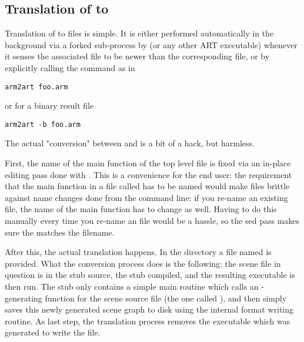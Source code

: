 \subsection{Translation of  to }

Translation of  to  files is simple. It is either
performed automatically in the background via a forked sub-process by  (or any other ART executable) whenever it senses the associated  file to be newer than the corresponding  file, or by explicitly calling the command
 as in
\begin{verbatim}
arm2art foo.arm
\end{verbatim}
or for a binary  result file
\begin{verbatim}
arm2art -b foo.arm
\end{verbatim}

The actual "conversion" between  and  is a bit of a hack, but harmless. 

First, the name of the main function of the top level  file is fixed via an in-place editing pass done with . This is a convenience for the end user: the requirement that the main function in a file called  has to be named  would make  files brittle against name changes done from the command line: if you re-name an existing  file, the name of the main function has to change as well. Having to do this manually every time you re-name an  file would be a hassle, so the sed pass makes sure the  matches the filename. 

After this, the actual translation happens. In the  directory a file named  is provided. What the conversion process does is the following: the scene file in question is  in the stub source, the stub compiled, and the resulting executable is then run. The stub only contains a simple main routine which calls an
-generating function for the scene source file (the one called ), and then simply saves this newly generated
scene graph to disk using the internal  format writing
routine. As last step, the translation process removes the executable which was generated to write the  file.


